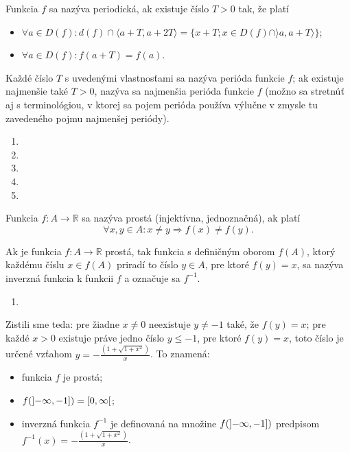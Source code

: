 Funkcia $f$ sa nazýva periodická, ak existuje číslo $T>0$ tak, že platí
\begin{itemize}
\item $\forall a\in D(f):d(f)\cap \langle a+T,a+2T\rangle=\{x+T;x\in D(f)\cap \rangle a,a+T\rangle\}$;
\item  $\forall a\in D(f):f(a+T)=f(a)$.
\end{itemize}

Každé číslo $T$ s uvedenými vlastnosťami sa nazýva perióda funkcie $f$; ak
existuje najmenšie také $T>0$, nazýva sa najmenšia perióda funkcie $f$ (možno sa
stretnúť aj s terminológiou, v ktorej sa pojem perióda používa výlučne v zmysle
tu zavedeného pojmu najmenšej periódy).

\begin{enumerate}[resume]
  \item {}
  \item {}
  \item {}
  \item {}
  \item {}
\end{enumerate}

Funkcia $f:A \rightarrow\mathbb{R}$ sa nazýva prostá (injektívna, jednoznačná),
ak platí $$\forall x,y\in A:x\neq y \Rightarrow f(x)\neq f(y).$$

Ak je funkcia $f:A \rightarrow \mathbb{R}$ prostá, tak funkcia s definičným
oborom $f(A)$, ktorý každému číslu $x\in f(A)$ priradí to číslo $y\in A$, pre
ktoré $f(y)=x$, sa nazýva inverzná funkcia k funkcii $f$ a označuje sa $f^{-1}$.

\begin{enumerate}[resume]
  \showanswers
    \item {}
  \hideanswers
\end{enumerate}

Zistili sme teda: pre žiadne $x\neq 0$ neexistuje $y\neq -1$ také, že $f(y)=x$;
pre každé $x>0$ existuje práve jedno číslo $y\leq -1$, pre ktoré $f(y)=x$, toto
číslo je určené vzťahom $y=-\frac{(1+\sqrt{1+x^2})}{x}$. To znamená:
\begin{itemize}
\item funkcia $f$ je prostá;
\item $f(\interval[open left]{-\infty}{-1})=\interval[open right]{0}{\infty}$;
\item
  inverzná funkcia $f^{-1}$ je definovaná na množine
  $f(\interval[open left]{-\infty}{-1})$ predpisom
  $f^{-1}(x)=-\frac{(1+\sqrt{1+x^2})}{x}$.
\end{itemize}

